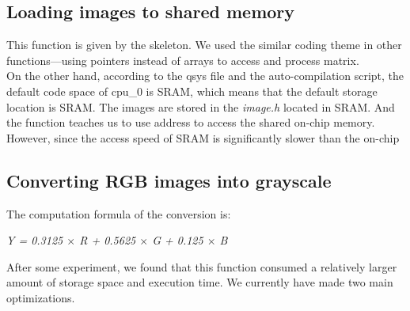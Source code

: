 \documentclass[conference]{IEEEtran}
\begin{document}
\subsection{Loading images to shared memory}
This function is given by the skeleton. We used the similar coding theme in other functions---using pointers instead of arrays to access and process matrix.\\
\indent
On the other hand, according to the qsys file and the auto-compilation script, the default code space of cpu\_0 is SRAM, which means that the default storage location is SRAM. The images are stored in the \emph{image.h} located in SRAM. And the function teaches us to use address to access the shared on-chip memory.\\
\indent
However, since the access speed of SRAM is significantly slower than the on-chip 
\subsection{Converting RGB images into grayscale}
The computation formula of the conversion is:
\begin{center}
	\emph{Y = 0.3125 $\times$ R + 0.5625 $\times$ G + 0.125 $\times$ B}
\end{center}
After some experiment, we found that this function consumed a relatively larger amount of storage space and execution time. We currently have made two main optimizations.
\end{document}
